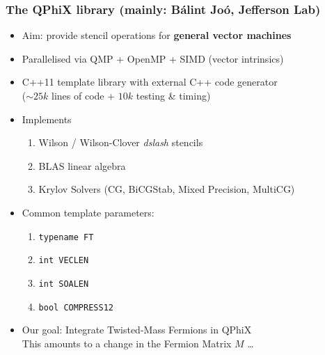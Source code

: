 \documentclass{beamer}
\begin{document}

  \begin{frame}
    \frametitle{The QPhiX library (mainly: Bálint Joó, Jefferson Lab)}

    \begin{itemize}
      \item Aim: provide stencil operations for \textbf{general vector machines}
        \vfill
      \item Parallelised via QMP + OpenMP + SIMD (vector intrinsics)
        \vfill
      \item C++11 template library with external C++ code generator\\
        ($\sim25k$ lines of code + $10k$ testing \& timing)
        \vfill
      \item Implements
        \begin{enumerate}
          \item Wilson / Wilson-Clover \textit{dslash} stencils
          \item BLAS linear algebra
          \item Krylov Solvers (CG, BiCGStab, Mixed Precision, MultiCG)
        \end{enumerate}
        \vfill
      \item Common template parameters:
        \begin{enumerate}
          \item \texttt{typename FT}
          \item \texttt{int VECLEN}
          \item \texttt{int SOALEN}
          \item \texttt{bool COMPRESS12}
        \end{enumerate}
        \vfill
      \item Our goal: Integrate Twisted-Mass Fermions in QPhiX \\
        This amounts to a change in the Fermion Matrix $M$ \dots
    \end{itemize}

  \end{frame}

\end{document}
